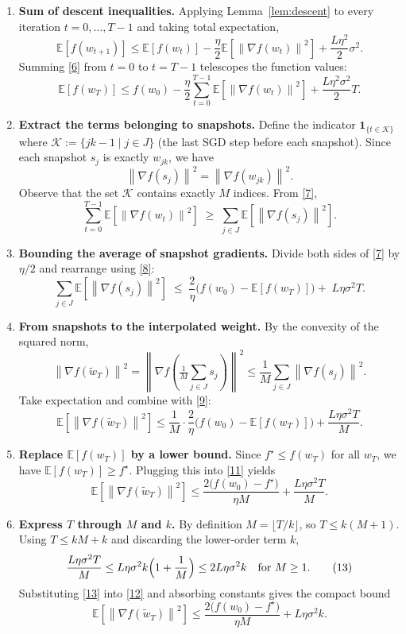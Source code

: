 \documentclass{article}
\newcommand{\E}{\mathbb{E}}
\newcommand{\norm}[1]{\left\|#1\right\|}
\begin{document}
\begin{enumerate}
\item[Step 1.] \textbf{Sum of descent inequalities.}  
Applying Lemma~\ref{lem:descent} to every iteration $t=0,\dots,T-1$ and taking total expectation,
\[
\E[f(w_{t+1})]\le \E[f(w_t)]-\frac{\eta}{2}\E[\norm{\nabla f(w_t)}^2]+\frac{L\eta^2}{2}\sigma^2 .
\tag{6}
\]
Summing \eqref{6} from $t=0$ to $t=T-1$ telescopes the function values:
\[
\E[f(w_T)]\le f(w_0)-\frac{\eta}{2}\sum_{t=0}^{T-1}\E[\norm{\nabla f(w_t)}^2]
+\frac{L\eta^2\sigma^2}{2}T .
\tag{7}
\]

\item[Step 2.] \textbf{Extract the terms belonging to snapshots.}  
Define the indicator $\mathbf{1}_{\{t\in\mathcal{K}\}}$ where $\mathcal{K}:=\{jk-1\mid j\in J\}$ (the last SGD step before each snapshot). Since each snapshot $s_j$ is exactly $w_{jk}$, we have
\[
\norm{\nabla f(s_j)}^2 = \norm{\nabla f(w_{jk})}^2 .
\]
Observe that the set $\mathcal{K}$ contains exactly $M$ indices. From \eqref{7},
\[
\sum_{t=0}^{T-1}\E[\norm{\nabla f(w_t)}^2]
\;\ge\;
\sum_{j\in J}\E[\norm{\nabla f(s_j)}^2] .
\tag{8}
\]

\item[Step 3.] \textbf{Bounding the average of snapshot gradients.}  
Divide both sides of \eqref{7} by $\eta/2$ and rearrange using \eqref{8}:
\[
\sum_{j\in J}\E[\norm{\nabla f(s_j)}^2]
\;\le\;
\frac{2}{\eta}\big(f(w_0)-\E[f(w_T)]\big)
+\;L\eta\sigma^2 T .
\tag{9}
\]

\item[Step 4.] \textbf{From snapshots to the interpolated weight.}  
By the convexity of the squared norm,
\[
\norm{\nabla f\!\left(\tilde w_T\right)}^2
= \norm{\nabla f\!\left(\tfrac1M\sum_{j\in J}s_j\right)}^2
\le \frac1M\sum_{j\in J}\norm{\nabla f(s_j)}^2 .
\tag{10}
\]
Take expectation and combine with \eqref{9}:
\[
\E\!\left[\norm{\nabla f(\tilde w_T)}^2\right]
\le \frac{1}{M}\cdot\frac{2}{\eta}\big(f(w_0)-\E[f(w_T)]\big)
+\frac{L\eta\sigma^2 T}{M}.
\tag{11}
\]

\item[Step 5.] \textbf{Replace $\E[f(w_T)]$ by a lower bound.}  
Since $f^\star\le f(w_T)$ for all $w_T$, we have $\E[f(w_T)]\ge f^\star$. Plugging this into \eqref{11} yields
\[
\E\!\left[\norm{\nabla f(\tilde w_T)}^2\right]
\le \frac{2\big(f(w_0)-f^\star\big)}{\eta M}
+\frac{L\eta\sigma^2 T}{M}.
\tag{12}
\]

\item[Step 6.] \textbf{Express $T$ through $M$ and $k$.}  
By definition $M=\lfloor T/k\rfloor$, so $T\le k(M+1)$. Using $T\le kM+k$ and discarding the lower‑order term $k$,
\[
\frac{L\eta\sigma^2 T}{M}\le L\eta\sigma^2 k\Bigl(1+\frac{1}{M}\Bigr)
\le 2L\eta\sigma^2 k \quad\text{for }M\ge1 .
\tag{13}
\]
Substituting \eqref{13} into \eqref{12} and absorbing constants gives the compact bound
\[
\E\!\left[\norm{\nabla f(\tilde w_T)}^2\right]
\le \frac{2\big(f(w_0)-f^\star\big)}{\eta M}
+L\eta\sigma^2 k .
\tag{14}
\]


\end{enumerate}
\end{document}
